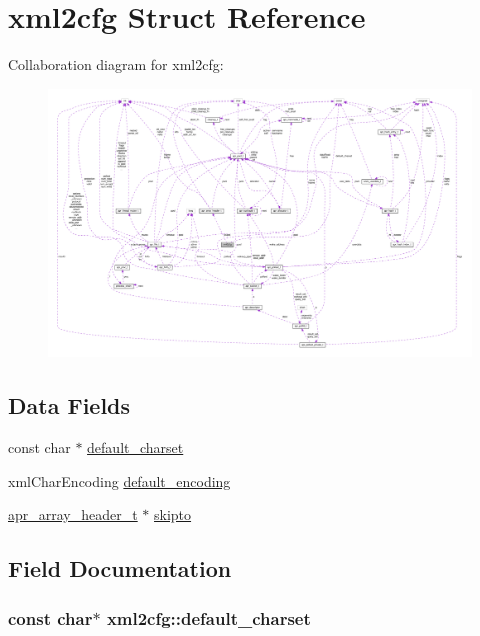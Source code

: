 \hypertarget{structxml2cfg}{}\section{xml2cfg Struct Reference}
\label{structxml2cfg}


Collaboration diagram for xml2cfg\+:
\nopagebreak
\begin{figure}[H]
\begin{center}
\leavevmode
\includegraphics[width=350pt]{structxml2cfg__coll__graph}
\end{center}
\end{figure}
\subsection*{Data Fields}
\begin{DoxyCompactItemize}
\item 
const char $\ast$ \hyperlink{structxml2cfg_a4e9804329ec7accaa66afd4d0b75cd2e}{default\+\_\+charset}
\item 
xml\+Char\+Encoding \hyperlink{structxml2cfg_ada5ab3fab0d8d282a6d9cd061e1404a8}{default\+\_\+encoding}
\item 
\hyperlink{structapr__array__header__t}{apr\+\_\+array\+\_\+header\+\_\+t} $\ast$ \hyperlink{structxml2cfg_a214dc39dfbb5e7bb0e3b01ccb0589b02}{skipto}
\end{DoxyCompactItemize}


\subsection{Field Documentation}
\subsubsection[{\texorpdfstring{default\+\_\+charset}{default_charset}}]{\setlength{\rightskip}{0pt plus 5cm}const char$\ast$ xml2cfg\+::default\+\_\+charset}\hypertarget{structxml2cfg_a4e9804329ec7accaa66afd4d0b75cd2e}{}\label{structxml2cfg_a4e9804329ec7accaa66afd4d0b75cd2e}
